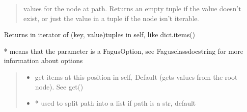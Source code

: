 \documentclass[a4paper,10pt,english]{sphinxmanual}
\begin{document}
\begin{fulllineitems}
\begin{fulllineitems}
\begin{quote}
\begin{description}
\begin{itemize}
\end{itemize}

\sphinxAtStartPar
values for the node at path. Returns an empty tuple if the value doesn’t exist, or just the value in a
tuple if the node isn’t iterable.

\end{description}\end{quote}

\end{fulllineitems}


\begin{fulllineitems}
\label{\detokenize{fagus:fagus.Fagus.items}}
\pysigstartsignatures
{}
\pysigstopsignatures
\sphinxAtStartPar
Returns in iterator of (key, value)\sphinxhyphen{}tuples in self, like dict.items()

\sphinxAtStartPar
* means that the parameter is a FagusOption, see Fagus\sphinxhyphen{}class\sphinxhyphen{}docstring for more information about options
\begin{quote}\begin{description}
\begin{itemize}
\item {}
\sphinxAtStartPar
{} \textendash{} get items at this position in self, Default  (gets values from the root node). See get()

\item {}
\sphinxAtStartPar
{} \textendash{} * used to split path into a list if path is a str, default 


\end{itemize}
\end{description}
\end{quote}
\end{fulllineitems}
\end{fulllineitems}
\end{document}
